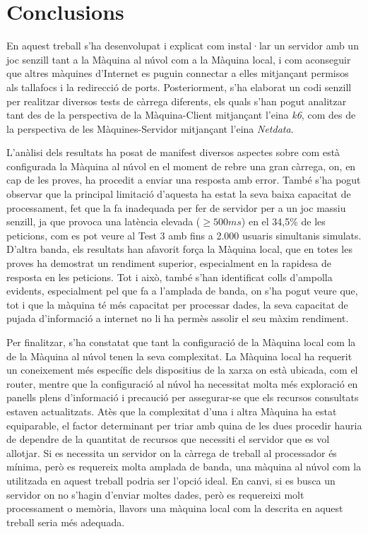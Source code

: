 \chapter{Conclusions}

En aquest treball s'ha desenvolupat i explicat com instal·lar un servidor amb un joc senzill tant a la Màquina al núvol com a la Màquina local, i com aconseguir que altres màquines d'Internet es puguin connectar a elles mitjançant permisos als tallafocs i la redirecció de ports. Posteriorment, s'ha elaborat un codi senzill per realitzar diversos tests de càrrega diferents, els quals s'han pogut analitzar tant des de la perspectiva de la Màquina-Client mitjançant l'eina \textit{k6}, com des de la perspectiva de les Màquines-Servidor mitjançant l'eina \textit{Netdata}.

L'anàlisi dels resultats ha posat de manifest diversos aspectes sobre com està configurada la Màquina al núvol en el moment de rebre una gran càrrega, on, en cap de les proves, ha procedit a enviar una resposta amb error. També s'ha pogut observar que la principal limitació d'aquesta ha estat la seva baixa capacitat de processament, fet que la fa inadequada per fer de servidor per a un joc massiu senzill, ja que provoca una latència elevada ($\geq 500ms$) en el 34,5\% de les peticions, com es pot veure al Test 3 amb fins a 2.000 usuaris simultanis simulats. D'altra banda, els resultats han afavorit força la Màquina local, que en totes les proves ha demostrat un rendiment superior, especialment en la rapidesa de resposta en les peticions. Tot i això, també s'han identificat colls d'ampolla evidents, especialment pel que fa a l'amplada de banda, on s'ha pogut veure que, tot i que la màquina té més capacitat per processar dades, la seva capacitat de pujada d'informació a internet no li ha permès assolir el seu màxim rendiment.

Per finalitzar, s'ha constatat que tant la configuració de la Màquina local com la de la Màquina al núvol tenen la seva complexitat. La Màquina local ha requerit un coneixement més específic dels dispositius de la xarxa on està ubicada, com el router, mentre que la configuració al núvol ha necessitat molta més exploració en panells plens d'informació i precaució per assegurar-se que els recursos consultats estaven actualitzats. Atès que la complexitat d'una i altra Màquina ha estat equiparable, el factor determinant per triar amb quina de les dues procedir hauria de dependre de la quantitat de recursos que necessiti el servidor que es vol allotjar. Si es necessita un servidor on la càrrega de treball al processador és mínima, però es requereix molta amplada de banda, una màquina al núvol com la utilitzada en aquest treball podria ser l'opció ideal. En canvi, si es busca un servidor on no s'hagin d'enviar moltes dades, però es requereixi molt processament o memòria, llavors una màquina local com la descrita en aquest treball seria més adequada.